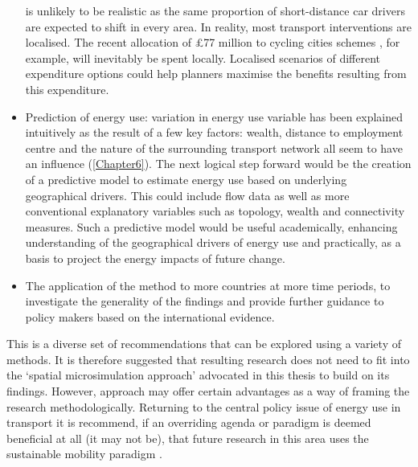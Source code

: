 \begin{itemize}
is unlikely to be realistic as the same proportion of short-distance car
drivers are expected to shift in every area. In reality, most transport
interventions are localised. The recent allocation of \pounds 77 million to
cycling cities schemes \citep{BBc2013-cycling}, for example, will inevitably be
spent locally. Localised scenarios of different expenditure options could help
planners maximise the benefits resulting from this expenditure.
\item Prediction of energy use: variation in energy use variable has been
explained intuitively as the result of a few key factors: wealth, distance to
employment centre and the nature of the surrounding transport network all seem
to have an influence (\cref{Chapter6}). The next logical step forward would
be the creation of a predictive model to estimate energy use based on
underlying geographical drivers. This could include flow data
\citep{Simini2012} as well as more conventional explanatory variables such as
topology, wealth and connectivity measures. Such a predictive model would be
useful academically, enhancing understanding of the geographical drivers of
energy use \citep{Steemers2003} and practically, as a basis to project the
energy impacts of future change.
\item The application of the method to more countries at more time periods, to
investigate the generality of the findings and provide further guidance to
policy makers based on the international evidence.
\end{itemize}
This is a diverse set of recommendations that can be explored using a variety
of methods. It is therefore suggested that resulting research does not 
need to fit into the `spatial microsimulation approach' advocated
in this thesis to build on its findings. However, approach
may offer certain advantages as a way of framing the research methodologically.
Returning to the central policy issue of energy use in transport
it is recommend, if an overriding agenda or
paradigm is deemed beneficial at all (it may not be), that future research
in this area uses the sustainable mobility paradigm \citet{Banister2008}.

